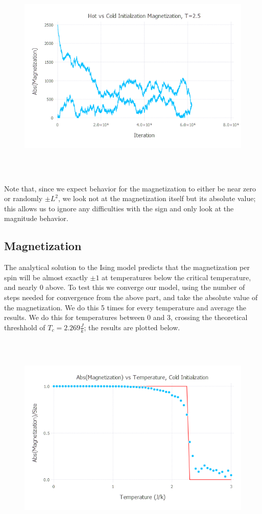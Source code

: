 \documentclass{article}
\begin{document}
\begin{figure}[H]
	\includegraphics[width=6in,height=4in]{"hotcold"}
\end{figure}

Note that, since we expect behavior for the magnetization to either be near zero or randomly $\pm L^2$, we look not at the magnetization itself but its absolute value; this allows us to ignore any difficulties with the sign and only look at the magnitude behavior.

\subsection{Magnetization}
The analytical solution to the Ising model predicts that the magnetization per spin will be almost exactly $\pm 1$ at temperatures below the critical temperature, and nearly $0$ above. To test this we converge our model, using the number of steps needed for convergence from the above part, and take the absolute value of the magnetization. We do this 5 times for every temperature and average the results. We do this for temperatures between 0 and 3, crossing the theoretical threshhold of $T_c = 2.269\frac{J}{k}$; the results are plotted below.

\begin{figure}[H]
	\includegraphics[width=6in,height=4in]{"tempvsmag_cold"}
\end{figure}
\end{document}
